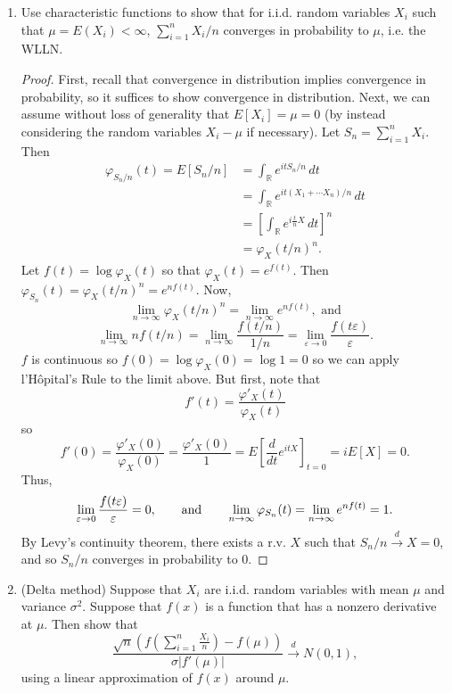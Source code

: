 \documentclass[11pt,oneside,english]{amsart}
\theoremstyle{definition}
\newcommand{\aspace}{\hspace{7mm}\text{and}\hspace{7mm}}
\newcommand{\ve}{\varepsilon}
\newcommand{\dd}[2]{\frac{d{#1}}{d{#2}}}
\newcommand{\MB}[1]{\mathbb{#1}}
\newcommand{\1}{\mathbbm{1}}
\begin{document}
\begin{enumerate}[leftmargin=*]
\vfill
\pagebreak
 


\item Use characteristic functions to show that for i.i.d. random variables $X_i$ such that $\mu=E(X_i)<\infty$, $\sum_{i=1}^n X_i/n$ converges in probability to $\mu$, i.e. the WLLN.


\begin{proof}
First, recall that convergence in distribution implies convergence in probability, so it suffices to show convergence in distribution. Next, we can assume without loss of generality that $E[X_i]=\mu=0$ (by instead considering the random variables $X_i-\mu$ if necessary). Let $S_n=\sum_{i=1}^n X_i$. Then
\begin{align*}
\varphi_{S_n/n}(t)=E[S_n/n]&=\int_\MB{R}e^{itS_n/n}\,dt\\[2mm]
&=\int_\MB{R}e^{it(X_1+\cdots  X_n)/n}\,dt\\[2mm]
&=\left[\int_\MB{R}e^{i\frac{t}{n}X}\,dt\right]^n\\[2mm]
&=\varphi_X(t/n)^n.
\end{align*}
Let $f(t)=\log\varphi_X(t)$ so that $\varphi_X(t)=e^{f(t)}$. Then $\varphi_{S_n}(t)=\varphi_X(t/n)^n=e^{nf(t)}$. Now,
\[
\lim_{n\to\infty}\varphi_X(t/n)^n=\lim_{n\to\infty} e^{nf(t)},\text{ and}
\]
\[
\lim_{n\to\infty}nf(t/n)=\lim_{n\to\infty}\frac{f(t/n)}{1/n}=\lim_{\ve\to0}\frac{f(t\ve)}{\ve}.
\]
$f$ is continuous so $f(0)=\log\varphi_X(0)=\log1=0$ so we can apply l'H\^{o}pital's Rule to the limit above. But first, note that
\[
f'(t)=\frac{\varphi'_X(t)}{\varphi_X(t)}
\]
so
\[
f'(0)=\frac{\varphi'_X(0)}{\varphi_X(0)}=\frac{\varphi'_X(0)}{1}=E\left[\dd{}{t}e^{itX}\right]_{t=0}=iE[X]=0.
\]
Thus,
\[
\lim_{\ve\to0}\frac{f(t\ve)}{\ve}=0, \aspace \lim_{n\to\infty}\varphi_{S_n}(t)=\lim_{n\to\infty} e^{nf(t)}=1.
\]
By Levy's continuity theorem, there exists a r.v. $X$ such that $S_n/n\xrightarrow{d} X=0$, and so $S_n/n$ converges in probability to 0.
\end{proof}





\pagebreak


\item (Delta method) Suppose that $X_i$ are i.i.d. random variables with mean $\mu$ and variance $\sigma^2$. Suppose that $f(x)$ is a function that has a nonzero derivative at $\mu$. Then show that
\[
\frac{\sqrt{n}\left(f\left(\sum_{i=1}^n\frac{X_i}{n}\right)-f(\mu)\right)}{\sigma|f'(\mu)|}\xrightarrow{d}N(0,1),
\]
using a linear approximation of $f(x)$ around $\mu$.



\end{enumerate}
\end{document}
